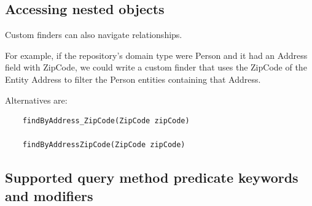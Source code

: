 \documentclass{scrartcl}
\begin{document}
\subsection{Accessing nested objects}

Custom finders can also navigate relationships.

For example, if the repository’s domain type were Person and it had an Address field with ZipCode, we could write a custom finder that uses the ZipCode of the Entity Address to filter the Person entities containing that Address.

Alternatives are:

\begin{lstlisting}
    findByAddress_ZipCode(ZipCode zipCode)

    findByAddressZipCode(ZipCode zipCode)
\end{lstlisting}

\subsection{Supported query method predicate keywords and modifiers}
\end{document}
